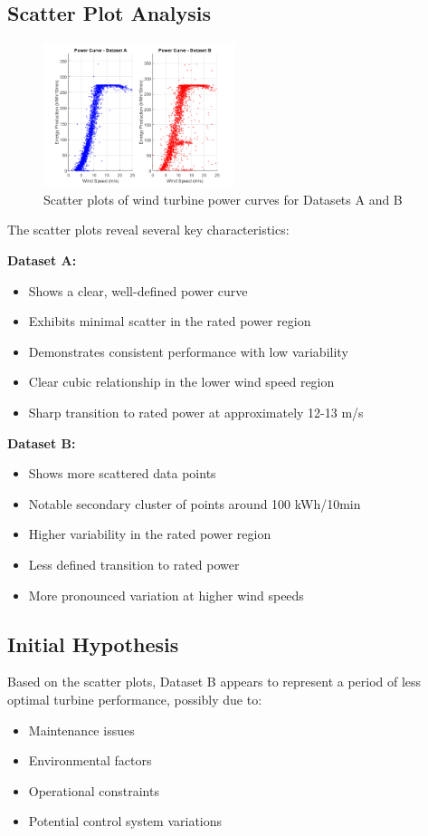 \documentclass[a4paper,11pt]{article}
\begin{document}
\subsection{Scatter Plot Analysis}
\begin{figure}[H]
    \centering
    \includegraphics[width=0.5\textwidth]{Figure1_PowerCurvesComparison.pdf}
    \caption{Scatter plots of wind turbine power curves for Datasets A and B}
    \label{fig:scatter}
\end{figure}

The scatter plots reveal several key characteristics:

\textbf{Dataset A:}
\begin{itemize}
    \item Shows a clear, well-defined power curve
    \item Exhibits minimal scatter in the rated power region
    \item Demonstrates consistent performance with low variability
    \item Clear cubic relationship in the lower wind speed region
    \item Sharp transition to rated power at approximately 12-13 \si{m/s}
\end{itemize}

\textbf{Dataset B:}
\begin{itemize}
    \item Shows more scattered data points
    \item Notable secondary cluster of points around 100 \si{kWh/10min}
    \item Higher variability in the rated power region
    \item Less defined transition to rated power
    \item More pronounced variation at higher wind speeds
\end{itemize}

\subsection{Initial Hypothesis}
Based on the scatter plots, Dataset B appears to represent a period of less optimal turbine performance, possibly due to:
\begin{itemize}
    \item Maintenance issues
    \item Environmental factors
    \item Operational constraints
    \item Potential control system variations
\end{itemize}
\end{document}
